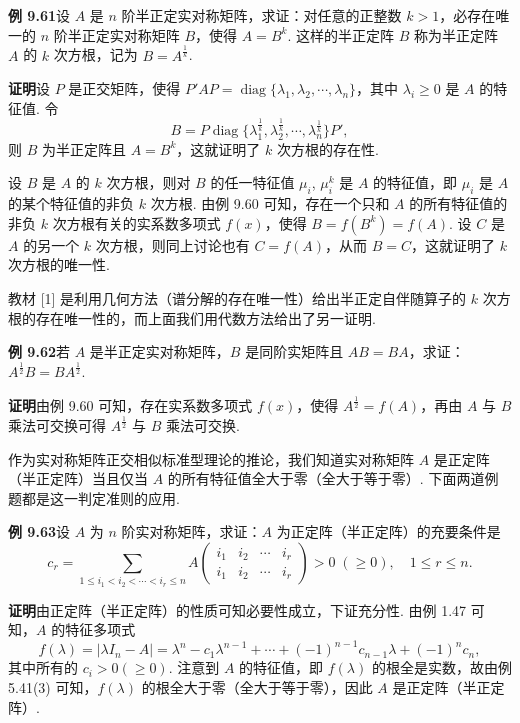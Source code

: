\documentclass[UTF8,12pt,a4paper,fontset=fandol]{ctexart}
\begin{document}
\noindent\textbf{例 9.61}\quad 设 $A$ 是 $n$ 阶半正定实对称矩阵，求证：对任意的正整数 $k>1$，必存在唯一的 $n$ 阶半正定实对称矩阵 $B$，使得 $A=B^k$. 这样的半正定阵 $B$ 称为半正定阵 $A$ 的 $k$ 次方根，记为 $B=A^{\frac1k}$.

\noindent\textbf{证明}\quad 设 $P$ 是正交矩阵，使得 $P'AP=\operatorname{diag}\{\lambda_1,\lambda_2,\cdots,\lambda_n\}$，其中 $\lambda_i\ge0$ 是 $A$ 的特征值. 令
\[
B=P\operatorname{diag}\{\lambda_1^{\frac1k},\lambda_2^{\frac1k},\cdots,\lambda_n^{\frac1k}\}P',
\]
则 $B$ 为半正定阵且 $A=B^k$，这就证明了 $k$ 次方根的存在性.

设 $B$ 是 $A$ 的 $k$ 次方根，则对 $B$ 的任一特征值 $\mu_i$, $\mu_i^k$ 是 $A$ 的特征值，即 $\mu_i$ 是 $A$ 的某个特征值的非负 $k$ 次方根. 由例 9.60 可知，存在一个只和 $A$ 的所有特征值的非负 $k$ 次方根有关的实系数多项式 $f(x)$，使得 $B=f(B^k)=f(A)$. 设 $C$ 是 $A$ 的另一个 $k$ 次方根，则同上讨论也有 $C=f(A)$，从而 $B=C$，这就证明了 $k$ 次方根的唯一性.

教材 [1] 是利用几何方法（谱分解的存在唯一性）给出半正定自伴随算子的 $k$ 次方根的存在唯一性的，而上面我们用代数方法给出了另一证明.

\noindent\textbf{例 9.62}\quad 若 $A$ 是半正定实对称矩阵，$B$ 是同阶实矩阵且 $AB=BA$，求证：$A^{\frac12}B=BA^{\frac12}$.

\noindent\textbf{证明}\quad 由例 9.60 可知，存在实系数多项式 $f(x)$，使得 $A^{\frac12}=f(A)$，再由 $A$ 与 $B$ 乘法可交换可得 $A^{\frac12}$ 与 $B$ 乘法可交换.

作为实对称矩阵正交相似标准型理论的推论，我们知道实对称矩阵 $A$ 是正定阵（半正定阵）当且仅当 $A$ 的所有特征值全大于零（全大于等于零）. 下面两道例题都是这一判定准则的应用.

\noindent\textbf{例 9.63}\quad 设 $A$ 为 $n$ 阶实对称矩阵，求证：$A$ 为正定阵（半正定阵）的充要条件是
\[
c_r=\sum_{1\le i_1<i_2<\cdots<i_r\le n}
A\begin{pmatrix}
i_1&i_2&\cdots&i_r\\
i_1&i_2&\cdots&i_r
\end{pmatrix}>0\;(\ge0),\quad 1\le r\le n.
\]

\noindent\textbf{证明}\quad 由正定阵（半正定阵）的性质可知必要性成立，下证充分性. 由例 1.47 可知，$A$ 的特征多项式
\[
f(\lambda)=|\lambda I_n-A|=\lambda^n-c_1\lambda^{n-1}+\cdots+(-1)^{n-1}c_{n-1}\lambda+(-1)^nc_n,
\]
其中所有的 $c_i>0(\ge0)$. 注意到 $A$ 的特征值，即 $f(\lambda)$ 的根全是实数，故由例 5.41(3) 可知，$f(\lambda)$ 的根全大于零（全大于等于零），因此 $A$ 是正定阵（半正定阵）.
\end{document}
